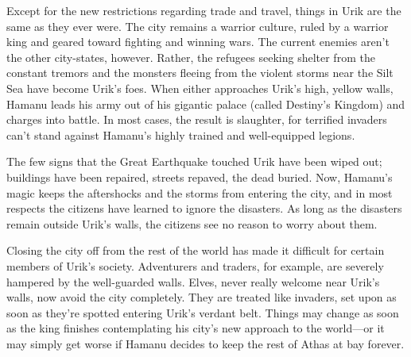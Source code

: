 {
	Except for the new restrictions regarding trade and travel, things in Urik are the same as they ever were. The city remains a warrior culture, ruled by a warrior king and geared toward fighting and winning wars. The current enemies aren't the other city-states, however. Rather, the refugees seeking shelter from the constant tremors and the monsters fleeing from the violent storms near the Silt Sea have become Urik's foes. When either approaches Urik's high, yellow walls, Hamanu leads his army out of his gigantic palace (called Destiny's Kingdom) and charges into battle. In most cases, the result is slaughter, for terrified invaders can't stand against Hamanu's highly trained and well-equipped legions.

	The few signs that the Great Earthquake touched Urik have been wiped out; buildings have been repaired, streets repaved, the dead buried. Now, Hamanu's magic keeps the aftershocks and the storms from entering the city, and in most respects the citizens have learned to ignore the disasters. As long as the disasters remain outside Urik's walls, the citizens see no reason to worry about them.

	Closing the city off from the rest of the world has made it difficult for certain members of Urik's society. Adventurers and traders, for example, are severely hampered by the well-guarded walls. Elves, never really welcome near Urik's walls, now avoid the city completely. They are treated like invaders, set upon as soon as they're spotted entering Urik's verdant belt. Things may change as soon as the king finishes contemplating his city's new approach to the world---or it may simply get worse if Hamanu decides to keep the rest of Athas at bay forever.
}

